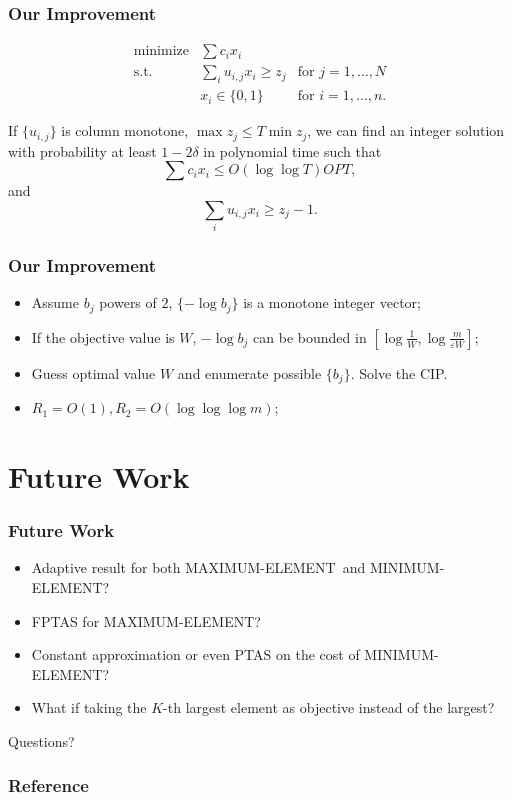 \documentclass{beamer}
\newcommand{\MM}{{\textsf{MAXIMUM-ELEMENT}}}
\newcommand{\mm}{{\textsf{MINIMUM-ELEMENT}}}
\begin{document}
\begin{frame}
    \frametitle{Our Improvement}
     \begin{align*}
                \text{minimize} & \sum c_i x_i & \\
                \text{s.t.}
                & \sum_i u_{i,j} x_i \geq z_j
                & \text{for } j = 1, \ldots, N\\
            & x_i \in \{0, 1\}
                & \text{for } i = 1, \ldots, n.
            \end{align*}

        \begin{theorem}
            If $\{u_{i,j}\}$ is column monotone, $\max z_j \leq T\min z_j$, we can find an integer solution with probability at least $1-2\delta$ in polynomial time such that
            $$\sum c_ix_i \leq O(\log\log T)OPT,$$
            and
            $$\sum_i u_{i,j} x_i \geq z_j - 1.$$
        \end{theorem}
\end{frame}

\begin{frame}
    \frametitle{Our Improvement}
    \begin{itemize}
        \item Assume $b_j$ powers of $2$, $\{-\log b_j\}$ is a monotone integer vector;
        \item If the objective value is $W$, $-\log b_j$ can be bounded in $[\log\frac{1}{W}, \log\frac{m}{\varepsilon W}]$;
        \item Guess optimal value $W$ and enumerate possible $\{b_j\}$. Solve the CIP.
        \item $R_1 = O(1), R_2 = O(\log\log\log m)$;
    \end{itemize}

\end{frame}

\section{Future Work}
\begin{frame}
    \frametitle{Future Work}
    \begin{itemize}
        \item Adaptive result for both \MM\ and \mm?
        \item FPTAS for \MM?
        \item Constant approximation or even PTAS on the cost of \mm?
        \item What if taking the $K$-th largest element as objective instead of the largest?
    \end{itemize}
\end{frame}

\begin{frame}
Questions?
\end{frame}

\begin{frame}\frametitle{Reference}


\end{frame}
\end{document}
